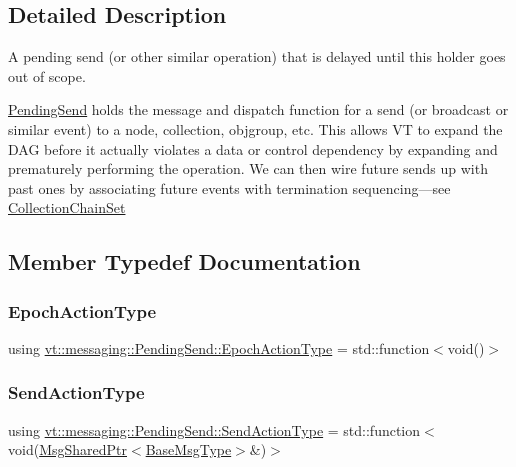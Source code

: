 \subsection{Detailed Description}
A pending send (or other similar operation) that is delayed until this holder goes out of scope. 

{\ttfamily \hyperlink{structvt_1_1messaging_1_1_pending_send}{Pending\+Send}} holds the message and dispatch function for a send (or broadcast or similar event) to a node, collection, objgroup, etc. This allows VT to expand the D\+AG before it actually violates a data or control dependency by expanding and prematurely performing the operation. We can then wire future sends up with past ones by associating future events with termination sequencing---see {\ttfamily \hyperlink{classvt_1_1messaging_1_1_collection_chain_set}{Collection\+Chain\+Set}} 

\subsection{Member Typedef Documentation}
\mbox{\label{structvt_1_1messaging_1_1_pending_send_a25131dc5a5e003dc65187edc97c23d1c}} 
\subsubsection{\texorpdfstring{Epoch\+Action\+Type}{EpochActionType}}
{\footnotesize\ttfamily using \hyperlink{structvt_1_1messaging_1_1_pending_send_a25131dc5a5e003dc65187edc97c23d1c}{vt\+::messaging\+::\+Pending\+Send\+::\+Epoch\+Action\+Type} =  std\+::function$<$void()$>$}

\mbox{\label{structvt_1_1messaging_1_1_pending_send_aa13248a342d68230048cde8e0756851c}} 
\subsubsection{\texorpdfstring{Send\+Action\+Type}{SendActionType}}
{\footnotesize\ttfamily using \hyperlink{structvt_1_1messaging_1_1_pending_send_aa13248a342d68230048cde8e0756851c}{vt\+::messaging\+::\+Pending\+Send\+::\+Send\+Action\+Type} =  std\+::function$<$void(\hyperlink{structvt_1_1messaging_1_1_msg_shared_ptr}{Msg\+Shared\+Ptr}$<$\hyperlink{namespacevt_a44d0d4e144748f2b19a1cfd962f50338}{Base\+Msg\+Type}$>$\&)$>$}



